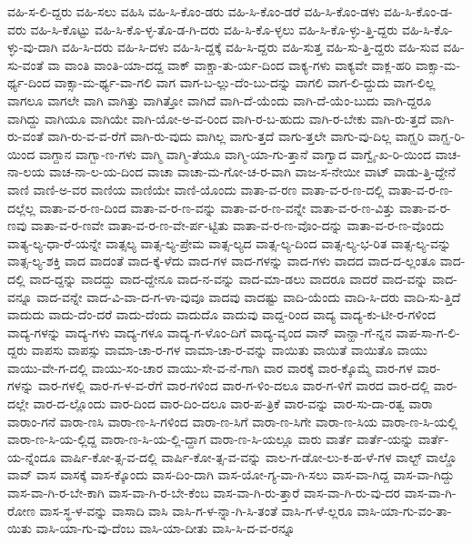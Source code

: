{ವಹಿ-ಸ-ಲಿ-ದ್ದರು
ವಹಿ-ಸಲು
ವಹಿಸಿ
ವಹಿ-ಸಿ-ಕೊಂ-ಡರು
ವಹಿ-ಸಿ-ಕೊಂ-ಡರೆ
ವಹಿ-ಸಿ-ಕೊಂ-ಡಳು
ವಹಿ-ಸಿ-ಕೊಂ-ಡ-ವರು
ವಹಿ-ಸಿ-ಕೊಟ್ಟು
ವಹಿ-ಸಿ-ಕೊ-ಳ್ಳ-ತೊ-ಡ-ಗಿ-ದರು
ವಹಿ-ಸಿ-ಕೊ-ಳ್ಳಲು
ವಹಿ-ಸಿ-ಕೊ-ಳ್ಳು-ತ್ತಿ-ದ್ದರು
ವಹಿ-ಸಿ-ಕೊ-ಳ್ಳು-ವು-ದಾಗಿ
ವಹಿ-ಸಿ-ದರು
ವಹಿ-ಸಿ-ದಳು
ವಹಿ-ಸಿ-ದ್ದಕ್ಕೆ
ವಹಿ-ಸಿ-ದ್ದರು
ವಹಿ-ಸುತ್ತ
ವಹಿ-ಸು-ತ್ತಿ-ದ್ದರು
ವಹಿ-ಸುವ
ವಹಿ-ಸು-ವಂತೆ
ವಾ
ವಾಂತಿ
ವಾಂತಿ-ಯಾ-ದದ್ದ
ವಾಕ್
ವಾಕ್ಚಾ-ತು-ರ್ಯ-ದಿಂದ
ವಾಕ್ಯ-ಗಳು
ವಾಕ್ಯವೇ
ವಾಕ್ಲ-ಹರಿ
ವಾಕ್ಸಾ-ಮ-ರ್ಥ್ಯ-ದಿಂದ
ವಾಕ್ಸಾ-ಮ-ರ್ಥ್ಯ-ವಾ-ಗಲಿ
ವಾಗ
ವಾಗ-ಬ-ಲ್ಲು-ದೆಂ-ಬು-ದನ್ನು
ವಾಗಲಿ
ವಾಗ-ಲಿ-ದ್ದುದು
ವಾಗ-ಲಿಲ್ಲ
ವಾಗಲೂ
ವಾಗಲೇ
ವಾಗಿ
ವಾಗಿತ್ತು
ವಾಗಿತ್ತೋ
ವಾಗಿದೆ
ವಾಗಿ-ದೆ-ಯೆಂದು
ವಾಗಿ-ದೆ-ಯೆಂ-ಬುದು
ವಾಗಿ-ದ್ದರೂ
ವಾಗಿದ್ದು
ವಾಗಿಯೂ
ವಾಗಿಯೇ
ವಾಗಿ-ಯೋ-ಅ-ವ-ರಿಂದ
ವಾಗಿ-ರ-ಬ-ಹುದು
ವಾಗಿ-ರ-ಬೇಕು
ವಾಗಿ-ರು-ತ್ತದೆ
ವಾಗಿ-ರು-ವಂತೆ
ವಾಗಿ-ರು-ವ-ವ-ರೆಗೆ
ವಾಗಿ-ರು-ವುದು
ವಾಗಿಲ್ಲ
ವಾಗು-ತ್ತದೆ
ವಾಗು-ತ್ತಲೇ
ವಾಗು-ವು-ದಿಲ್ಲ
ವಾಗ್ಝರಿ
ವಾಗ್ಝ-ರಿ-ಯಿಂದ
ವಾಗ್ದಾನ
ವಾಗ್ಬಾ-ಣ-ಗಳು
ವಾಗ್ಮಿ
ವಾಗ್ಮಿ-ತೆಯೂ
ವಾಗ್ಮಿ-ಯಾ-ಗು-ತ್ತಾನೆ
ವಾಗ್ವಾದ
ವಾಗ್ವೈ-ಖ-ರಿ-ಯಿಂದ
ವಾಚ-ನಾ-ಲಯ
ವಾಚ-ನಾ-ಲ-ಯ-ದಿಂದ
ವಾಚಾ
ವಾಚಾ-ಮ-ಗೋ-ಚ-ರ-ವಾಗಿ
ವಾಜ-ಸ-ನೇಯೀ
ವಾಟ್
ವಾಡು-ತ್ತಿ-ದ್ದೇನೆ
ವಾಣಿ
ವಾಣಿ-ಅ-ವರ
ವಾಣಿಯ
ವಾಣಿಯೇ
ವಾಣಿ-ಯೊಂದು
ವಾತಾ-ವ-ರಣ
ವಾತಾ-ವ-ರ-ಣ-ದಲ್ಲಿ
ವಾತಾ-ವ-ರ-ಣ-ದಲ್ಲೆಲ್ಲ
ವಾತಾ-ವ-ರ-ಣ-ದಿಂದ
ವಾತಾ-ವ-ರ-ಣ-ವನ್ನು
ವಾತಾ-ವ-ರ-ಣ-ವನ್ನೇ
ವಾತಾ-ವ-ರ-ಣ-ವಿತ್ತು
ವಾತಾ-ವ-ರ-ಣವು
ವಾತಾ-ವ-ರ-ಣವೇ
ವಾತಾ-ವ-ರ-ಣ-ವೇ-ರ್ಪ-ಟ್ಟಿತು
ವಾತಾ-ವ-ರ-ಣ-ವೊಂ-ದನ್ನು
ವಾತಾ-ವ-ರ-ಣ-ವೊಂದು
ವಾತ್ಯ-ಲ್ಯ-ಧಾ-ರೆ-ಯನ್ನೇ
ವಾತ್ಸಲ್ಯ
ವಾತ್ಸ-ಲ್ಯ-ಪ್ರೇಮ
ವಾತ್ಸ-ಲ್ಯದ
ವಾತ್ಸ-ಲ್ಯ-ದಿಂದ
ವಾತ್ಸ-ಲ್ಯ-ಭ-ರಿತ
ವಾತ್ಸ-ಲ್ಯ-ವನ್ನು
ವಾತ್ಸ-ಲ್ಯ-ಶಕ್ತಿ
ವಾದ
ವಾದಂತೆ
ವಾದ-ಕ್ಕೆ-ಳೆದು
ವಾದ-ಗಳ
ವಾದ-ಗಳನ್ನು
ವಾದ-ಗಳು
ವಾದದ
ವಾದ-ದ-ಲ್ಲಂತೂ
ವಾದ-ದಲ್ಲಿ
ವಾದ-ದ್ದನ್ನು
ವಾದದ್ದು
ವಾದ-ದ್ದೇನೂ
ವಾದ-ನ-ವನ್ನು
ವಾದ-ಮಾ-ಡಲು
ವಾದರೂ
ವಾದರೆ
ವಾದ-ವನ್ನು
ವಾದ-ವನ್ನೂ
ವಾದ-ವನ್ನೇ
ವಾದ-ವಿ-ವಾ-ದ-ಗ-ಳಾ-ವುವೂ
ವಾದವು
ವಾದಷ್ಟು
ವಾದಿ-ಯೆಂದು
ವಾದಿ-ಸಿ-ದರು
ವಾದಿ-ಸು-ತ್ತಿದೆ
ವಾದುದು
ವಾದು-ದೆಂ-ದರೆ
ವಾದು-ದೆಂದು
ವಾದುದೊ
ವಾದುವು
ವಾದ್ದ-ರಿಂದ
ವಾದ್ಯ
ವಾದ್ಯ-ಕು-ಟೀ-ರ-ಗಳಿಂದ
ವಾದ್ಯ-ಗಳನ್ನು
ವಾದ್ಯ-ಗಳು
ವಾದ್ಯ-ಗಳೂ
ವಾದ್ಯ-ಗ-ಳೊಂ-ದಿಗೆ
ವಾದ್ಯ-ವೃಂದ
ವಾನ್
ವಾನ್ಹಾ-ಗೆ-ನ್ನನ
ವಾಪ-ಸಾ-ಗ-ಲಿ-ದ್ದರು
ವಾಪಸು
ವಾಪಸ್ಸು
ವಾಮಾ-ಚಾ-ರ-ಗಳ
ವಾಮಾ-ಚಾ-ರ-ವನ್ನು
ವಾಯಿತು
ವಾಯಿತೆ
ವಾಯಿತೊ
ವಾಯು
ವಾಯು-ವೇ-ಗ-ದಲ್ಲಿ
ವಾಯು-ಸಂ-ಚಾರ
ವಾಯು-ಸೇ-ವ-ನೆ-ಗಾಗಿ
ವಾರ
ವಾರಕ್ಕೆ
ವಾರ-ಕ್ಕೊಮ್ಮೆ
ವಾರ-ಗಳ
ವಾರ-ಗಳನ್ನು
ವಾರ-ಗಳಲ್ಲಿ
ವಾರ-ಗ-ಳ-ವ-ರೆಗೆ
ವಾರ-ಗಳಿಂದ
ವಾರ-ಗ-ಳಿಂ-ದಲೂ
ವಾರ-ಗ-ಳಿಗೆ
ವಾರದ
ವಾರ-ದಲ್ಲಿ
ವಾರ-ದಲ್ಲೇ
ವಾರ-ದ-ಲ್ಲೊಂದು
ವಾರ-ದಿಂದ
ವಾರ-ದಿಂ-ದಲೂ
ವಾರ-ಪ-ತ್ರಿಕೆ
ವಾರ-ವನ್ನು
ವಾರ-ಸು-ದಾ-ರತ್ವ
ವಾರಾ
ವಾರಾಂ-ಗನೆ
ವಾರಾ-ಣಸಿ
ವಾರಾ-ಣ-ಸಿ-ಗಳಿಂದ
ವಾರಾ-ಣ-ಸಿಗೆ
ವಾರಾ-ಣ-ಸಿಗೇ
ವಾರಾ-ಣ-ಸಿಯ
ವಾರಾ-ಣ-ಸಿ-ಯಲ್ಲಿ
ವಾರಾ-ಣ-ಸಿ-ಯ-ಲ್ಲಿದ್ದ
ವಾರಾ-ಣ-ಸಿ-ಯ-ಲ್ಲಿ-ದ್ದಾಗ
ವಾರಾ-ಣ-ಸಿ-ಯಲ್ಲೂ
ವಾರು
ವಾರ್ತೆ
ವಾರ್ತೆ-ಯನ್ನು
ವಾರ್ತೆ-ಯ-ನ್ನೆಂದೂ
ವಾರ್ಷಿ-ಕೋ-ತ್ಸ-ವ-ದಲ್ಲಿ
ವಾರ್ಷಿ-ಕೋ-ತ್ಸ-ವ-ವನ್ನು
ವಾಲ-ಗ-ಡೋ-ಲು-ಕ-ಹ-ಳೆ-ಗಳ
ವಾಲ್ಟ್
ವಾಲ್ಡೊ
ವಾವ್
ವಾಸ
ವಾಸಕ್ಕೆ
ವಾಸ-ಕ್ಕೊಂದು
ವಾಸ-ದಿಂ-ದಾಗಿ
ವಾಸ-ಯೋ-ಗ್ಯ-ವಾ-ಗಿ-ಸಲು
ವಾಸ-ವಾ-ಗಿದ್ದ
ವಾಸ-ವಾ-ಗಿದ್ದು
ವಾಸ-ವಾ-ಗಿ-ರ-ಬೇ-ಕಾಗಿ
ವಾಸ-ವಾ-ಗಿ-ರ-ಬೇ-ಕೆಂಬ
ವಾಸ-ವಾ-ಗಿ-ರು-ತ್ತಾರೆ
ವಾಸ-ವಾ-ಗಿ-ರು-ವು-ದರ
ವಾಸ-ವಾ-ಗಿ-ರೋಣ
ವಾಸ-ಸ್ಥ-ಳ-ವನ್ನು
ವಾಸಾದಿ
ವಾಸಿ
ವಾಸಿ-ಗ-ಳ-ನ್ನಾ-ಗಿ-ಸಿ-ತಂತೆ
ವಾಸಿ-ಗ-ಳೆ-ಲ್ಲರೂ
ವಾಸಿ-ಯಾ-ಗು-ವಂ-ತಾ-ಯಿತು
ವಾಸಿ-ಯಾ-ಗು-ವು-ದೆಂಬ
ವಾಸಿ-ಯಾ-ದೀತು
ವಾಸಿ-ಸಿ-ದ-ವ-ರನ್ನೂ
}
